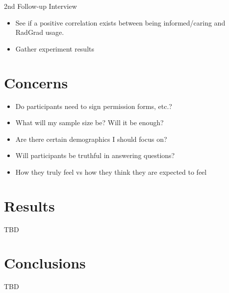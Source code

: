 \documentclass[english]{proposalnsf}
\begin{document}
  2nd Follow-up Interview
  \begin{itemize}
    \item See if a positive correlation exists between being informed/caring and RadGrad usage.
    \item Gather experiment results
  \end{itemize}

  \section{Concerns}
  \label{questions-concerns}

  \begin{itemize}
    \item Do participants need to sign permission forms, etc.?
    \item What will my sample size be? Will it be enough?
    \item Are there certain demographics I should focus on?
    \item Will participants be truthful in answering questions?
    \item How they truly feel vs how they think they are expected to feel
  \end{itemize}

  \section{Results}
  \label{results}

  TBD

  \section{Conclusions}
  \label{conclusions}

  TBD

  
  

  \appendix
\end{document}
